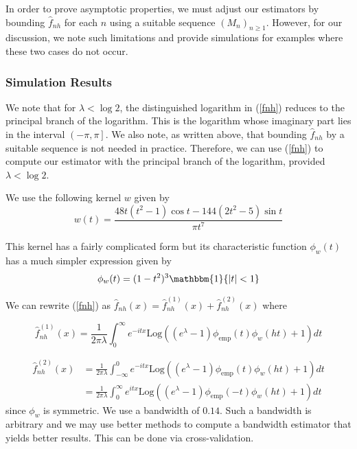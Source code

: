 \documentclass[a4paper,11pt]{article}
\theoremstyle{theorem}
\theoremstyle{definition}
\begin{document}
In order to prove asymptotic properties, we must adjust our estimators by bounding $\hat{f}_{nh}$ for each $n$ using a suitable sequence $(M_{n})_{n \geq 1}$. However, for our discussion, we note such limitations and provide simulations for examples where these two cases do not occur.

\subsubsection{Simulation Results}

We note that for $\lambda < \log2$, the distinguished logarithm in (\ref{fnh}) reduces to the principal branch of the logarithm. This is the logarithm whose imaginary part lies in the interval $\left(-\pi, \pi\right]$. We also note, as written above, that bounding $\hat{f}_{nh}$ by a suitable sequence is not needed in practice. Therefore, we can use (\ref{fnh}) to compute our estimator with the principal branch of the logarithm, provided $\lambda < \log 2$.

We use the following kernel $w$ given by
\[
w(t) = \frac{48t(t^{2} - 1)\cos t - 144(2t^{2} - 5)\sin t}{\pi t^{7}}
\]

This kernel has a fairly complicated form but its characteristic function $\phi_{w}(t)$ has a much simpler expression given by
\[
\phi_{w}(t) = (1 - t^{2})^{3}\mathbbm{1}\{|t| < 1\}
\]

We can rewrite (\ref{fnh}) as $\hat{f}_{nh}(x) = \hat{f}_{nh}^{(1)}(x) + \hat{f}_{nh}^{(2)}(x)$ where

\begin{equation} \label{fnh1}
\hat{f}_{nh}^{(1)}(x) = \frac{1}{2\pi\lambda}\int_{0}^{\infty}{e^{-itx}\text{Log}\left((e^{\lambda} - 1)\phi_{\text{emp}}(t)\phi_{w}(ht) + 1\right)}dt 
\end{equation}

\begin{align}
\hat{f}_{nh}^{(2)}(x) &= \frac{1}{2\pi\lambda}\int_{-\infty}^{0}{e^{-itx}\text{Log}\left((e^{\lambda} - 1)\phi_{\text{emp}}(t)\phi_{w}(ht) + 1\right)}dt \nonumber \\
                      &= \frac{1}{2\pi\lambda}\int_{0}^{\infty}{e^{itx}\text{Log}\left((e^{\lambda} - 1)\phi_{\text{emp}}(-t)\phi_{w}(ht) + 1\right)}dt \label{fnh2}
\end{align}
since $\phi_{w}$ is symmetric.
We use a bandwidth of $0.14$. Such a bandwidth is arbitrary and we may use better methods to compute a bandwidth estimator that yields better results. This can be done via cross-validation.
\end{document}
